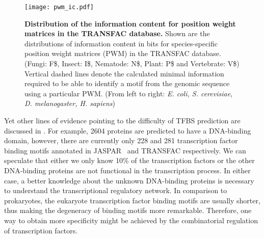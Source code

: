 \begin{figure}[!ht]
\begin{center}
\texttt{[image: pwm\_ic.pdf]}
\end{center}
\caption[Information content of position weight matrices]{
{\bf Distribution of the information content for position weight matrices in 
the TRANSFAC database.}
Shown are the distributions of information content in bits for species-specific
position weight matrices (PWM) in the TRANSFAC database. (Fungi: F\$, Insect: I\$,
Nematode: N\$, Plant: P\$ and Vertebrate: V\$) Vertical dashed lines denote
the calculated minimal information required to be able to identify a motif from
the genomic sequence using a particular PWM. (From left to right: \emph{E. coli, 
S. cerevisiae, D. melanogaster, H. sapiens})
}
\label{fig:pwm_ic}
\end{figure}

Yet other lines of evidence pointing to the difficulty of TFBS prediction are
discussed in \cite{Babu2004}. For example, 2604 proteins are predicted to
have a DNA-binding domain, however, there are currently only 228 and 281 
transcription
factor binding motifs annotated in JASPAR~\citep{Sandelin2004} and TRANSFAC 
respectively. We can speculate that either we only know 10\% of the transcription
factors or the other DNA-binding proteins are not functional in the transcription
process. In either case, a better knowledge about the unknown DNA-binding
proteins is necessary to understand the transcriptional regulatory network.
In comparison to prokaryotes, the eukaryote transcription factor binding motifs 
are usually shorter, thus making the degeneracy of binding motifs more remarkable.
Therefore, one way to obtain more specificity might be achieved by the 
combinatorial regulation of transcription factors.
